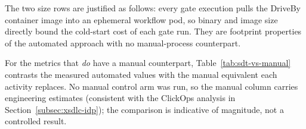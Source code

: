 \begin{table}[htbp]
\centering
\caption{CI/CD integration metrics for the DriveBy framework. Latency rows report values observed during the PoC; size rows are properties of the released artefacts.}
\label{tab:cicd-metrics}
\small
{}
\end{table}

The two size rows are justified as follows: every gate execution pulls the DriveBy container image into an ephemeral workflow pod, so binary and image size directly bound the cold-start cost of each gate run. They are footprint properties of the automated approach with no manual-process counterpart.

For the metrics that \emph{do} have a manual counterpart, Table~\ref{tab:sdt-vs-manual} contrasts the measured automated values with the manual equivalent each activity replaces. No manual control arm was run, so the manual column carries engineering estimates (consistent with the ClickOps analysis in Section~\ref{subsec:xsdlc-idp}); the comparison is indicative of magnitude, not a controlled result.

